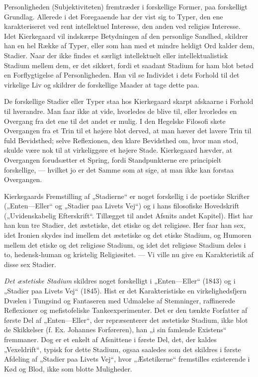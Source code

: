 \documentclass[12pt,a4paper,openany]{book}
\newcommand{\opage}[1]{\marginnote{\footnotesize\textit{[#1]}}}
\begin{document}
Personligheden (Subjektiviteten) fremtræder i forskellige Former, paa
forskelligt Grundlag. Allerede i det Foregaaende har der vist sig to Typer, den
ene karakteriseret ved rent intellektuel Interesse, den anden ved religiøs
Interesse. Idet Kierkegaard vil indskærpe Betydningen af den personlige
Sandhed, skildrer han en hel Række af Typer, eller som han med et mindre
heldigt Ord kalder dem, Stadier. Naar der ikke findes et særligt intellektuelt
eller intellektualistisk Stadium mellem dem, er det sikkert, fordi et saadant
Stadium for ham blot betød en Forflygtigelse af Personligheden. Han vil se
Individet i dets Forhold til det virkelige Liv og skildrer de forskellige
Maader at tage dette paa.

De forskellige Stadier eller Typer staa hos Kierkegaard skarpt afskaarne i
Forhold til hverandre. Man faar ikke at vide, hvorledes de blive til, eller
hvorledes en Overgang fra det ene til det andet er mulig. I den Hegelske
Filosofi skete Overgangen fra et Trin til et højere blot derved, at man hæver
det lavere Trin til fuld Bevidsthed; selve Reflexionen, den klare Bevidsthed
om, hvor man stod, skulde være nok til at virkeliggøre et højere Stade.
Kierkegaard hævder, at Overgangen forudsætter et Spring, fordi Standpunkterne
ere principielt forskellige, --- hvilket jo er det Samme som at sige, at man
ikke kan forstaa Overgangen.

Kierkegaards Fremstilling af „Stadierne“ er noget forskellig i de poetiske
Skrifter („Enten---Eller“ og „Stadier paa Livets Vej“) og i hans filosofiske
Hovedskrift („Uvidenskabelig Efterskrift“. Tillægget til andet Afsnits andet
Kapitel).
\setcounter{footnote}{0}%
\opage{157}Hist har han kun tre Stadier, det æstetiske, det etiske og det
religiøse. Her faar han sex, idet Ironien skydes ind imellem det æstetiske og
det etiske Stadium, og Humoren mellem det etiske og det religiøse Stadium, og
idet det religiøse Stadium deles i to, hedensk-human og kristelig Religiøsitet.
--- Vi ville nu give en Karakteristik af disse sex Stadier.

\textit{Det æstetiske Stadium} skildres noget forskelligt i „Enten---Eller“
(1843) og i „Stadier paa Livets Vej“ (1845). Hist er det Karakteristiske en
virkelighedsfjern Dvælen i Tungsind og Fantaseren med Udmalelse af Stemninger,
raffinerede Reflexioner og mefistofeliske Tankeexperimenter. Det er den tænkte
Forfatter af første Del af „Enten---Eller“, der repræsenterer det æstetiske
Stadium, ikke blot de Skikkelser (f. Ex. Johannes Forføreren), han „i sin
famlende Existens“ fremmaner. Dog er et enkelt af Afsnittene i første Del, det,
der kaldes „Vexeldrift“, typisk for dette Stadium, ogsaa saaledes som det
skildres i første Afdeling af „Stadier paa Livets Vej“, hvor „Æstetikerne“
fremstilles existerende i Kød og Blod, ikke som blotte Muligheder.
\end{document}
